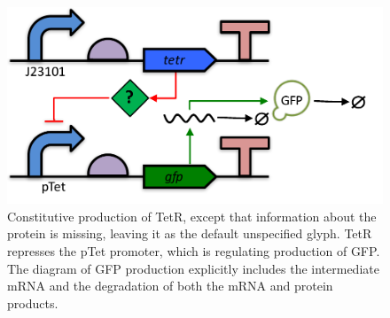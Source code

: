 \begin{figure}[h!]
\includegraphics[scale=0.5]{figures/apdx-examples/apdx-exa13.pdf}
\caption{Constitutive production of TetR, except that information about the protein is missing, leaving it as the default unspecified glyph. TetR represses the pTet promoter, which is regulating production of GFP.  The diagram of GFP production explicitly includes the intermediate mRNA and the degradation of both the mRNA and protein products.}
\label{f:apdx:exa13}
\end{figure}

\begin{figure}[h!]
\vspace{2in}
\end{figure}

